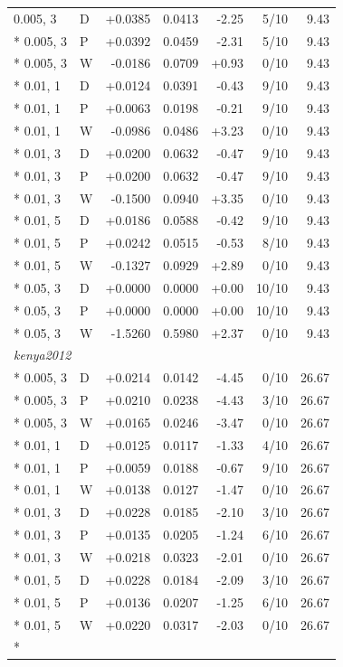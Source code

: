\begin{longtable}{llrrrrr}
0.005, 3 & D & +0.0385 & 0.0413 & -2.25 & 5/10 & 9.43\\*
0.005, 3 & P & +0.0392 & 0.0459 & -2.31 & 5/10 & 9.43\\*
0.005, 3 & W & -0.0186 & 0.0709 & +0.93 & 0/10 & 9.43\\*
0.01, 1 & D & +0.0124 & 0.0391 & -0.43 & 9/10 & 9.43\\*
0.01, 1 & P & +0.0063 & 0.0198 & -0.21 & 9/10 & 9.43\\*
0.01, 1 & W & -0.0986 & 0.0486 & +3.23 & 0/10 & 9.43\\*
0.01, 3 & D & +0.0200 & 0.0632 & -0.47 & 9/10 & 9.43\\*
0.01, 3 & P & +0.0200 & 0.0632 & -0.47 & 9/10 & 9.43\\*
0.01, 3 & W & -0.1500 & 0.0940 & +3.35 & 0/10 & 9.43\\*
0.01, 5 & D & +0.0186 & 0.0588 & -0.42 & 9/10 & 9.43\\*
0.01, 5 & P & +0.0242 & 0.0515 & -0.53 & 8/10 & 9.43\\*
0.01, 5 & W & -0.1327 & 0.0929 & +2.89 & 0/10 & 9.43\\*
0.05, 3 & D & +0.0000 & 0.0000 & +0.00 & 10/10 & 9.43\\*
0.05, 3 & P & +0.0000 & 0.0000 & +0.00 & 10/10 & 9.43\\*
0.05, 3 & W & -1.5260 & 0.5980 & +2.37 & 0/10 & 9.43\\
\multicolumn{7}{l}{\textit{kenya2012}}\\*
0.005, 3 & D & +0.0214 & 0.0142 & -4.45 & 0/10 & 26.67\\*
0.005, 3 & P & +0.0210 & 0.0238 & -4.43 & 3/10 & 26.67\\*
0.005, 3 & W & +0.0165 & 0.0246 & -3.47 & 0/10 & 26.67\\*
0.01, 1 & D & +0.0125 & 0.0117 & -1.33 & 4/10 & 26.67\\*
0.01, 1 & P & +0.0059 & 0.0188 & -0.67 & 9/10 & 26.67\\*
0.01, 1 & W & +0.0138 & 0.0127 & -1.47 & 0/10 & 26.67\\*
0.01, 3 & D & +0.0228 & 0.0185 & -2.10 & 3/10 & 26.67\\*
0.01, 3 & P & +0.0135 & 0.0205 & -1.24 & 6/10 & 26.67\\*
0.01, 3 & W & +0.0218 & 0.0323 & -2.01 & 0/10 & 26.67\\*
0.01, 5 & D & +0.0228 & 0.0184 & -2.09 & 3/10 & 26.67\\*
0.01, 5 & P & +0.0136 & 0.0207 & -1.25 & 6/10 & 26.67\\*
0.01, 5 & W & +0.0220 & 0.0317 & -2.03 & 0/10 & 26.67\\*

\end{longtable}
